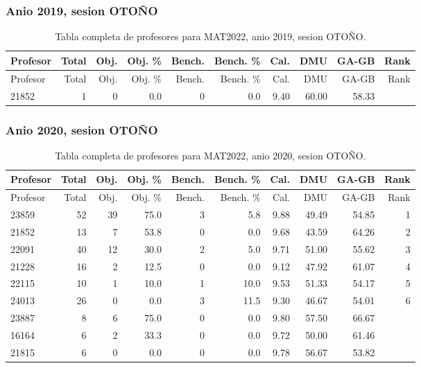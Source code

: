 \subsubsection{Anio 2019, sesion OTOÑO}

\begingroup
\scriptsize
\setlength{\tabcolsep}{3pt}
\begin{longtable}{lrrrrrrrrr}
\caption{Tabla completa de profesores para MAT2022, anio 2019, sesion OTOÑO.}\label{tab:prof-period-mat2022-2019-oto-o}\\
\toprule
Profesor & Total & Obj. & Obj. \% & Bench. & Bench. \% & Cal. & DMU & GA-GB & Rank \\
\midrule
\endfirsthead
\toprule
Profesor & Total & Obj. & Obj. \% & Bench. & Bench. \% & Cal. & DMU & GA-GB & Rank \\
\midrule
\endhead
21852 & 1 & 0 & 0.0 & 0 & 0.0 & 9.40 & 60.00 & 58.33 &  \\
\bottomrule
\end{longtable}
\endgroup

\subsubsection{Anio 2020, sesion OTOÑO}

\begingroup
\scriptsize
\setlength{\tabcolsep}{3pt}
\begin{longtable}{lrrrrrrrrr}
\caption{Tabla completa de profesores para MAT2022, anio 2020, sesion OTOÑO.}\label{tab:prof-period-mat2022-2020-oto-o}\\
\toprule
Profesor & Total & Obj. & Obj. \% & Bench. & Bench. \% & Cal. & DMU & GA-GB & Rank \\
\midrule
\endfirsthead
\toprule
Profesor & Total & Obj. & Obj. \% & Bench. & Bench. \% & Cal. & DMU & GA-GB & Rank \\
\midrule
\endhead
23859 & 52 & 39 & 75.0 & 3 & 5.8 & 9.88 & 49.49 & 54.85 & 1 \\
21852 & 13 & 7 & 53.8 & 0 & 0.0 & 9.68 & 43.59 & 64.26 & 2 \\
22091 & 40 & 12 & 30.0 & 2 & 5.0 & 9.71 & 51.00 & 55.62 & 3 \\
21228 & 16 & 2 & 12.5 & 0 & 0.0 & 9.12 & 47.92 & 61.07 & 4 \\
22115 & 10 & 1 & 10.0 & 1 & 10.0 & 9.53 & 51.33 & 54.17 & 5 \\
24013 & 26 & 0 & 0.0 & 3 & 11.5 & 9.30 & 46.67 & 54.01 & 6 \\
23887 & 8 & 6 & 75.0 & 0 & 0.0 & 9.80 & 57.50 & 66.67 &  \\
16164 & 6 & 2 & 33.3 & 0 & 0.0 & 9.72 & 50.00 & 61.46 &  \\
21815 & 6 & 0 & 0.0 & 0 & 0.0 & 9.78 & 56.67 & 53.82 &  \\
\bottomrule
\end{longtable}
\endgroup

